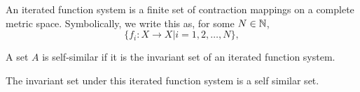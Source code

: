 \begin{definition}
    An iterated function system is a finite set of contraction mappings on a complete metric space.  Symbolically, we write this as, for some $N \in \mathbb{N}$,
    $$\{f_i:X \to X \vert i = 1,2,\dots, N\}, $$
\end{definition}

\begin{definition}
    A set $A$ is self-similar if it is the invariant set of an iterated function system. 
\end{definition}


The invariant set under this iterated function system is a self similar set.